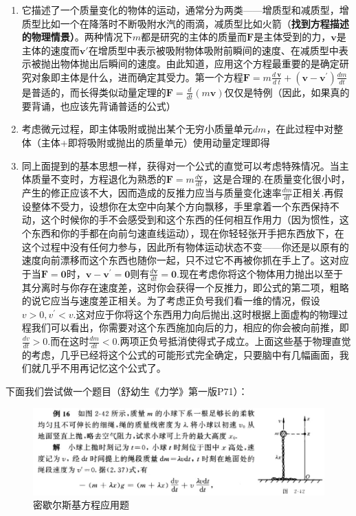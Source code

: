 \documentclass{ctexart}
\begin{document}
\begin{myexample}
\begin{enumerate}[leftmargin=*, labelsep=0.5em]
    \begin{enumerate}[leftmargin=*, labelsep=0.5em]
      \item 它描述了一个质量变化的物体的运动，通常分为两类——增质型和减质型，增质型比如一个在降落时不断吸附水汽的雨滴，减质型比如火箭（\textbf{找到方程描述的物理情景）}。两种情况下$m$都是研究的主体的质量而$\mathbf{F}$是主体受到的力，$\mathbf{v}$是主体的速度而$\mathbf{v}'$在增质型中表示被吸附物体吸附前瞬间的速度、在减质型中表示被抛出物体抛出后瞬间的速度。由此知道，应用这个方程最重要的是确定研究对象即主体是什么，进而确定其受力。第一个方程$\mathbf{F} = m\frac{d\ \mathbf{v}}{d\ t} + \left( \mathbf{v} - \mathbf{v}^{'} \right)\frac{dm}{dt}$是普适的，而长得类似动量定理的$\mathbf{F} = \frac{d}{dt}(m\mathbf{v})$仅仅是特例（因此，如果真的要背诵，也应该先背诵普适的公式）
      
      \item 考虑微元过程，即主体吸附或抛出某个无穷小质量单元$dm$，在此过程中对整体（主体+即将吸附或抛出的质量单元）使用动量定理即得
      
      \item 同上面提到的基本思想一样，获得对一个公式的直觉可以考虑特殊情况。当主体质量不变时，方程退化为熟悉的$\mathbf{F} = m\frac{d\mathbf{v}}{dt}$，这是合理的.在质量变化很小时，产生的修正应该不大，因而造成的反推力应当与质量变化速率$\frac{dm}{dt}$正相关.再假设整体不受力，设想你在太空中向某个方向飘移，手里拿着一个东西保持不动，这个时候你的手不会感受到和这个东西的任何相互作用力（因为惯性，这个东西和你的手都在向前匀速直线运动），现在你轻轻张开手把东西放下，在这个过程中没有任何力参与，因此所有物体运动状态不变——你还是以原有的速度向前漂移而这个东西也随你一起，只不过它不再被你抓在手上了。这对应于当$\mathbf{F} = \mathbf{0}$时，$\mathbf{v} - \mathbf{v}^{'} = \mathbf{0}$则有$\frac{d\mathbf{v}}{dt} = \mathbf{0}$.现在考虑你将这个物体用力抛出以至于其分离时与你存在速度差，这时你会获得一个反推力，即公式的第二项，粗略的说它应当与速度差正相关。为了考虑正负号我们看一维的情况，假设$v > 0,v^{'} < v$.这对应于你将这个东西用力向后抛出,这时根据上面虚构的物理过程我们可以看出，你需要对这个东西施加向后的力，相应的你会被向前推，即$\frac{dv}{dt} > 0.$而在这时$\frac{dm}{dt} < 0$.两项正负号抵消使得式子成立。上面这些基于物理直觉的考虑，几乎已经将这个公式的可能形式完全确定，只要脑中有几幅画面，我们就几乎不用再记忆这个公式了。
    \end{enumerate}
    
    下面我们尝试做一个题目（舒幼生《力学》第一版P71）：
    
    \begin{figure}[H]
      \centering
      \includegraphics[width=.8\linewidth]{fig/力学题.JPG}
      \caption{密歇尔斯基方程应用题}
      \label{fig:mechanics}
    \end{figure}
    

\end{enumerate}
\end{myexample}
\end{document}
